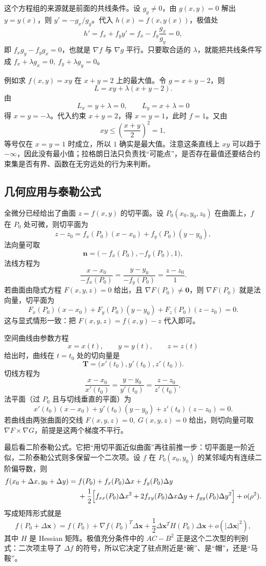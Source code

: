 这个方程组的来源就是前面的共线条件。设 \(g_y\neq0\)，由 \(g(x,y)=0\) 解出 \(y=y(x)\)，则 \(y'=-g_x/g_y\)。代入 \(h(x)=f(x,y(x))\)，极值处
\[
    h'=f_x+f_y y'
    =f_x-f_y\frac{g_x}{g_y}=0,
\]
即 \(f_x g_y-f_y g_x=0\)，也就是 \(\nabla f\) 与 \(\nabla g\) 平行。只要取合适的 \(\lambda\)，就能把共线条件写成 \(f_x+\lambda g_x=0,\ f_y+\lambda g_y=0\)。

例如求 \(f(x,y)=xy\) 在 \(x+y=2\) 上的最大值。令 \(g=x+y-2\)，则
\[
    L=xy+\lambda(x+y-2).
\]
由
\[
    L_x=y+\lambda=0,\qquad L_y=x+\lambda=0
\]
得 \(x=y=-\lambda\)。代入约束 \(x+y=2\)，得 \(x=y=1\)，此时 \(f=1\)。又由
\[
    xy\le\left(\frac{x+y}{2}\right)^2=1,
\]
等号仅在 \(x=y=1\) 时成立，所以 \(1\) 确实是最大值。注意这条直线上 \(xy\) 可以趋于 \(-\infty\)，因此没有最小值；拉格朗日法只负责找“可能点”，是否存在最值还要结合约束集是否有界、函数在无穷远处的行为来判断。

\subsection{几何应用与泰勒公式}

全微分已经给出了曲面 \(z=f(x,y)\) 的切平面。设 \(P_0(x_0,y_0,z_0)\) 在曲面上，\(f\) 在 \(P_0\) 处可微，则切平面为
\[
    z-z_0=f_x(P_0)(x-x_0)+f_y(P_0)(y-y_0),
\]
法向量可取
\[
    \mathbf n=\bigl(-f_x(P_0),-f_y(P_0),1\bigr),
\]
法线方程为
\[
    \frac{x-x_0}{-f_x(P_0)}
    =\frac{y-y_0}{-f_y(P_0)}
    =\frac{z-z_0}{1}.
\]
若曲面由隐式方程 \(F(x,y,z)=0\) 给出，且 \(\nabla F(P_0)\neq\mathbf 0\)，则 \(\nabla F(P_0)\) 就是法向量，切平面为
\[
    F_x(P_0)(x-x_0)+F_y(P_0)(y-y_0)+F_z(P_0)(z-z_0)=0.
\]
这与显式情形一致：把 \(F(x,y,z)=f(x,y)-z\) 代入即可。

空间曲线由参数方程
\[
    x=x(t),\qquad y=y(t),\qquad z=z(t)
\]
给出时，曲线在 \(t=t_0\) 处的切向量是
\[
    \mathbf T=\bigl(x'(t_0),y'(t_0),z'(t_0)\bigr).
\]
切线方程为
\[
    \frac{x-x_0}{x'(t_0)}
    =\frac{y-y_0}{y'(t_0)}
    =\frac{z-z_0}{z'(t_0)},
\]
法平面（过 \(P_0\) 且与切线垂直的平面）为
\[
    x'(t_0)(x-x_0)+y'(t_0)(y-y_0)+z'(t_0)(z-z_0)=0.
\]
若曲线由两张曲面的交线 \(F(x,y,z)=0,\ G(x,y,z)=0\) 给出，则切向量可取 \(\nabla F\times\nabla G\)，前提是这两个梯度不平行。

最后看二阶泰勒公式。它把“用切平面近似曲面”再往前推一步：切平面是一阶近似，二阶泰勒公式则多保留一个二次项。设 \(f\) 在 \(P_0(x_0,y_0)\) 的某邻域内有连续二阶偏导数，则
\[
\begin{aligned}
    f(x_0+\Delta x,y_0+\Delta y)
    ={}&f(P_0)+f_x(P_0)\Delta x+f_y(P_0)\Delta y\\
    &+\frac12\Bigl[
        f_{xx}(P_0)\Delta x^2
        +2f_{xy}(P_0)\Delta x\Delta y
        +f_{yy}(P_0)\Delta y^2
    \Bigr]+o(\rho^2).
\end{aligned}
\]
写成矩阵形式就是
\[
    f(P_0+\Delta\mathbf x)
    =f(P_0)+\nabla f(P_0)^T\Delta\mathbf x
    +\frac12\Delta\mathbf x^T H(P_0)\Delta\mathbf x
    +o(\lvert\Delta\mathbf x\rvert^2),
\]
其中 \(H\) 是 Hessian 矩阵。极值充分条件中的 \(AC-B^2\) 正是这个二次型的判别式：二次项主导了 \(\Delta f\) 的符号，所以它决定了驻点附近是“碗”、是“帽”，还是“马鞍”。

